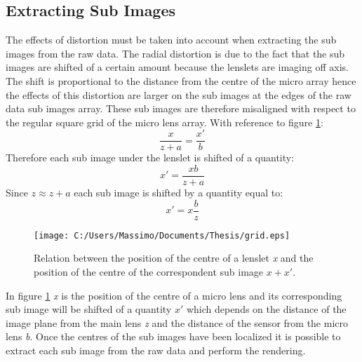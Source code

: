 \subsection{Extracting Sub Images}
\label{sec:isolating}
The effects of distortion must be taken into account when extracting the sub images from the raw data.
The radial distortion is due to the fact that the sub images are shifted of a certain amount because the lenslets are imaging off axis. The shift is proportional to the distance from the centre of the micro array \cite{pedrotti1993introduction} hence the effects of this distortion are larger on the sub images at the edges of the raw data sub images array. These sub images are therefore misaligned with respect to the regular square grid of the micro lens array. 
With reference to figure \ref{fig:grid}:
\begin{equation}
 \label{eq:pincushio1}
\dfrac{x}{z+a}=\dfrac{x'}{b}
\end{equation}
Therefore each sub image under the lenslet is shifted of a quantity:
 \begin{equation}
 \label{eq:pincushion2}
 x' = \dfrac{xb}{z+a}
 \end{equation}
 Since $z \approx z+a$ each sub image is shifted by a quantity equal to:
\begin{equation}
\label{eq:pincushion}
x' = x\dfrac{b}{z}
\end{equation}
\begin{figure}[H]
	\centering
	\texttt{[image: C:/Users/Massimo/Documents/Thesis/grid.eps]}
	\caption{\label{fig:grid} Relation between the position of the centre of a lenslet \textit{x} and the position of the centre of the correspondent sub image $x + x'$.  }
\end{figure}
In figure \ref{fig:grid} \textit{x} is the position of the centre of a micro lens and its corresponding sub image will be shifted of a quantity $x'$ which depends on the distance of the image plane from the main lens \textit{z} and the distance of the sensor from the micro lens \textit{b}. Once the centres of the sub images have been localized it is possible to extract each sub image from the raw data and perform the rendering.
